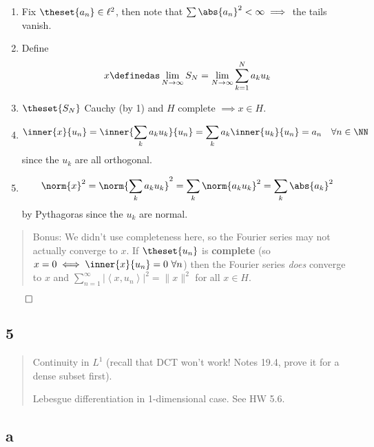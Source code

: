 \begin{enumerate}
\def\labelenumi{\arabic{enumi}.}
\item
  Fix \(\theset{a_n} \in \ell^2\), then note that
  \(\sum \abs{a_n}^2 < \infty \implies\) the tails vanish.
\item
  Define
  \begin{align*}
  x \definedas \displaystyle\lim_{N\to\infty} S_N = \lim_{N\to \infty} \sum_{k=1}^N a_k u_k
  \end{align*}
\item
  \(\theset{S_N}\) Cauchy (by 1) and \(H\) complete \(\implies x\in H\).
\item

  \begin{align*}
  \inner{x}{u_n} = \inner{\sum_k a_k u_k}{u_n} = \sum_k a_k \inner{u_k}{u_n} = a_n \quad \forall n\in \NN
  \end{align*} since the \(u_k\) are all orthogonal.
\item

  \begin{align*}
  \norm{x}^2 = \norm{\sum_k a_k u_k}^2 = \sum_k \norm{a_k u_k}^2 = \sum_k \abs{a_k}^2
  \end{align*} by Pythagoras since the \(u_k\) are normal.
\end{enumerate}

\begin{quote}
Bonus: We didn't use completeness here, so the Fourier series may not
actually converge to \(x\). If \(\theset{u_n}\) is \textbf{complete} (so
\(x = 0 \iff \inner{x}{u_n} = 0 ~\forall n\)) then the Fourier series
\emph{does} converge to \(x\) and
\(\sum_{n=1}^{\infty}\left|\left\langle x, u_{n}\right\rangle\right|^{2}=\|x\|^{2}\)
for all \(x \in H\).
\end{quote}

\(\qed\)

\hypertarget{section-4}{%
\subsection{5}\label{section-4}}

\begin{quote}
Continuity in \(L^1\) (recall that DCT won't work! Notes 19.4, prove it
for a dense subset first).

Lebesgue differentiation in 1-dimensional case. See HW 5.6.
\end{quote}

\hypertarget{a-3}{%
\subsection{a}\label{a-3}}

